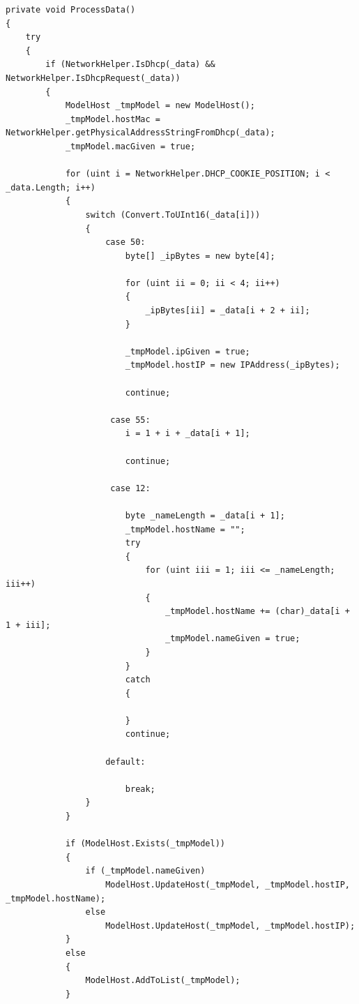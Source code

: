 \documentclass[12pt,a4paper]{report}
\begin{document}
\begin{onehalfspace}
\begin{lstlisting}
private void ProcessData()
{
    try
    {
    	if (NetworkHelper.IsDhcp(_data) && NetworkHelper.IsDhcpRequest(_data))
        {
        	ModelHost _tmpModel = new ModelHost();
            _tmpModel.hostMac = NetworkHelper.getPhysicalAddressStringFromDhcp(_data);
            _tmpModel.macGiven = true;

    		for (uint i = NetworkHelper.DHCP_COOKIE_POSITION; i < _data.Length; i++)
            {
            	switch (Convert.ToUInt16(_data[i]))
                {
                	case 50:
                    	byte[] _ipBytes = new byte[4];

                        for (uint ii = 0; ii < 4; ii++)
                        {
                        	_ipBytes[ii] = _data[i + 2 + ii];
                        }

                        _tmpModel.ipGiven = true;
                        _tmpModel.hostIP = new IPAddress(_ipBytes);

                        continue;

                     case 55:
                     	i = 1 + i + _data[i + 1];

                        continue;

                     case 12:

                        byte _nameLength = _data[i + 1];
                        _tmpModel.hostName = "";
                        try
                        {
                            for (uint iii = 1; iii <= _nameLength; iii++)
                            {
                            	_tmpModel.hostName += (char)_data[i + 1 + iii];
                                _tmpModel.nameGiven = true;
                            }
                        }
                        catch
                        {

                        }
                        continue;

                    default:

                    	break;
                }
            }

            if (ModelHost.Exists(_tmpModel))
            {
            	if (_tmpModel.nameGiven)
                	ModelHost.UpdateHost(_tmpModel, _tmpModel.hostIP, _tmpModel.hostName);
                else
                	ModelHost.UpdateHost(_tmpModel, _tmpModel.hostIP);
            }
            else
            {
            	ModelHost.AddToList(_tmpModel);
            }


\end{lstlisting}
\end{onehalfspace}
\end{document}
